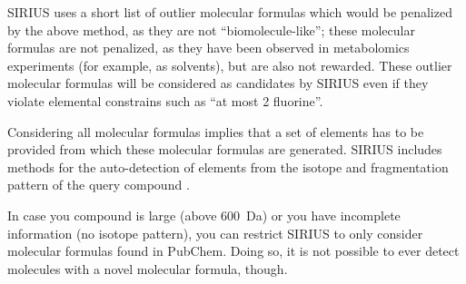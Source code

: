 \documentclass[letterpaper,10pt,openany,oneside]{sphinxmanual}
\newcommand{\todo}[1]{\xspace{\bfseries\sffamily\textcolor{red}{[#1]}}\xspace}
\begin{document}
%

SIRIUS uses a short list of outlier molecular formulas which would be
penalized by the above method, as they are not ``biomolecule-like''; these
molecular formulas are not penalized, as they have been observed in
metabolomics experiments (for example, as solvents), but are also not
rewarded. These outlier molecular formulas
will be considered as candidates by SIRIUS even if they violate elemental
constrains such as ``at most 2 fluorine''.  

Considering all molecular formulas implies that a set of elements has to be
provided from which these molecular formulas are generated.  SIRIUS
includes methods for the auto-detection of elements from the isotope and
fragmentation pattern of the query compound \citep{meusel16predicting}.

In case you compound is large (above 600~Da) or you have incomplete
information (no isotope pattern), you can restrict SIRIUS to only consider
molecular formulas found in PubChem.  Doing so, it is not possible to ever
detect molecules with a novel molecular formula, though.
\end{document}
